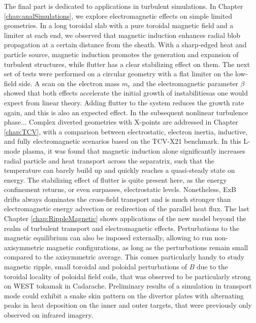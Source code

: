 The final part is dedicated to applications in turbulent simulations. In Chapter \ref{chap:analSimulations}, we explore electromagnetic effects on simple limited geometries. In a long toroidal slab with a pure toroidal magnetic field and a limiter at each end, we observed that magnetic induction enhances radial blob propagation at a certain distance from the sheath. With a sharp-edged heat and particle source, magnetic induction promotes the generation and expansion of turbulent structures, while flutter has a clear stabilizing effect on them. The next set of tests were performed on a circular geometry with a flat limiter on the low-field side. A scan on the electron mass $m_e$ and the electromagnetic parameter $\beta$ showed that both effects accelerate the initial growth of instabilitiesas one would expect from linear theory. Adding flutter to the system reduces the growth rate again, and this is also an expected effect. In the subsequent nonlinear turbulence phase... Complex diverted geometries with X-points are addressed in Chapter \ref{chap:TCV}, with a comparison between electrostatic, electron inertia, inductive, and fully electromagnetic scenarios based on the TCV-X21 benchmark. In this L-mode plasma, it was found that magnetic induction alone significantly increases radial particle and heat transport across the separatrix, such that the temperature can barely build up and quickly reaches a quasi-steady state on energy. The stabilizing effect of flutter is quite present here, as the energy confinement returns, or even surpasses, electrostatic levels. Nonetheless, ExB drifts always dominates the cross-field transport and is much stronger than electromagnetic energy advection or redirection of the parallel heat flux. The last Chapter \ref{chap:RippleMagnetic} shows applications of the new model beyond the realm of turbulent transport and electromagnetic effects. Perturbations to the magnetic equilibrium can also be imposed externally, allowing to run non-axisymmetric magnetic configurations, as long as the perturbations remain small compared to the axisymmetric average. This comes particularly handy to study magnetic ripple, small toroidal and poloidal perturbations of $B$ due to the toroidal locality of poloidal field coils, that was observed to be particularly strong on WEST tokamak in Cadarache. Preliminary results of a simulation in transport mode could exhibit a snake skin pattern on the divertor plates with alternating peaks in heat deposition on the inner and outer targets, that were previously only observed on infrared imagery. 






